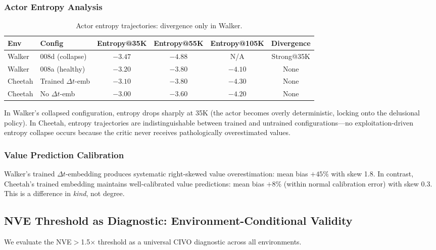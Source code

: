 \documentclass[letterpaper]{article}
\begin{document}
\subsubsection{Actor Entropy Analysis}

\begin{table}[h]
\centering
\caption{Actor entropy trajectories: divergence only in Walker.}
\label{tab:entropy}
\begin{tabular}{llcccc}
\toprule
Env & Config & Entropy@35K & Entropy@55K & Entropy@105K & Divergence \\
\midrule
Walker & 008d (collapse) & $-3.47$ & $-4.88$ & N/A & Strong@35K \\
Walker & 008a (healthy) & $-3.20$ & $-3.80$ & $-4.10$ & None \\
Cheetah & Trained $\Delta t$-emb & $-3.10$ & $-3.80$ & $-4.30$ & None \\
Cheetah & No $\Delta t$-emb & $-3.00$ & $-3.60$ & $-4.20$ & None \\
\bottomrule
\end{tabular}
\end{table}

In Walker's collapsed configuration, entropy drops sharply at 35K (the actor becomes overly deterministic, locking onto the delusional policy). In Cheetah, entropy trajectories are indistinguishable between trained and untrained configurations---no exploitation-driven entropy collapse occurs because the critic never receives pathologically overestimated values.

\subsubsection{Value Prediction Calibration}

Walker's trained $\Delta t$-embedding produces systematic right-skewed value overestimation: mean bias $+45\%$ with skew 1.8. In contrast, Cheetah's trained embedding maintains well-calibrated value predictions: mean bias $+8\%$ (within normal calibration error) with skew 0.3. This is a difference in \emph{kind}, not degree.

\subsection{NVE Threshold as Diagnostic: Environment-Conditional Validity}

We evaluate the NVE$>$1.5$\times$ threshold as a universal CIVO diagnostic across all environments.
\end{document}

